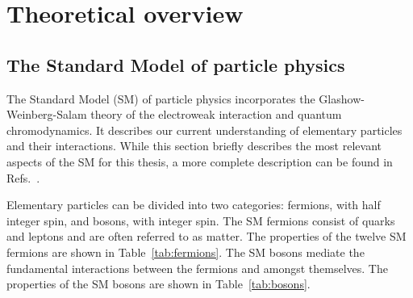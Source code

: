 \section{Theoretical overview}
\label{sec:theory}


\subsection{The Standard Model of particle physics}
\label{sec:theory:overview}

The Standard Model (SM) of particle physics incorporates the Glashow-Weinberg-Salam theory of the electroweak interaction and quantum chromodynamics. It describes our current understanding of elementary particles and their interactions. While this section briefly describes the most relevant aspects of the SM for this thesis, a more complete description can be found in Refs.~\cite{griffiths,halzen}.

Elementary particles can be divided into two categories: fermions, with half integer spin, and bosons, with integer spin. The SM fermions consist of quarks and leptons and are often referred to as matter. The properties of the twelve SM fermions are shown in Table~\ref{tab:fermions}. The SM bosons mediate the fundamental interactions between the fermions and amongst themselves. The properties of the SM bosons are shown in Table~\ref{tab:bosons}.

